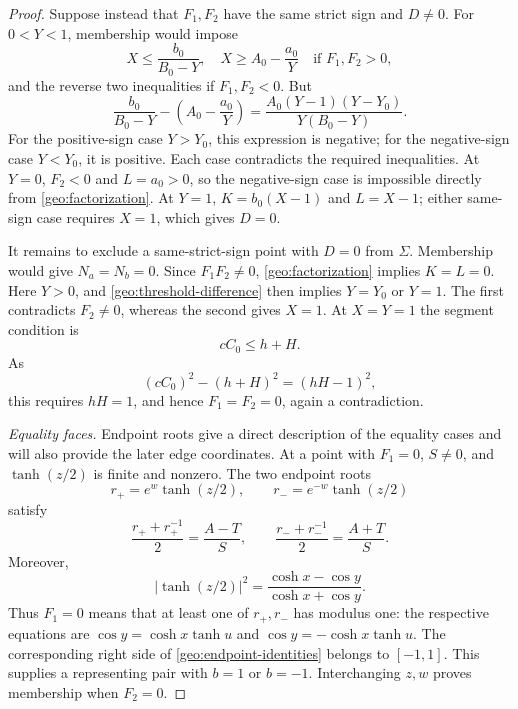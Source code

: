 \documentclass[11pt]{article}
\numberwithin{equation}{section}
\theoremstyle{definition}
\begin{document}
\begin{proof}
Suppose instead that \(F_1,F_2\) have the same strict sign and
\(D\ne0\).  For \(0<Y<1\), membership would impose
\[
 X\leq\frac{b_0}{B_0-Y},\quad
 X\geq A_0-\frac{a_0}{Y}
 \quad\text{if }F_1,F_2>0,
\]
and the reverse two inequalities if \(F_1,F_2<0\).  But
\begin{equation}\label{geo:threshold-difference}
 \frac{b_0}{B_0-Y}-\left(A_0-\frac{a_0}{Y}\right)
 =\frac{A_0(Y-1)(Y-Y_0)}{Y(B_0-Y)}.
\end{equation}
For the positive-sign case \(Y>Y_0\), this expression is negative;
for the negative-sign case \(Y<Y_0\), it is positive.  Each case
contradicts the required inequalities.  At \(Y=0\), \(F_2<0\)
and \(L=a_0>0\), so the negative-sign case is impossible directly
from \eqref{geo:factorization}.  At \(Y=1\),
\(K=b_0(X-1)\) and \(L=X-1\); either same-sign case requires
\(X=1\), which gives \(D=0\).

It remains to exclude a same-strict-sign point with \(D=0\)
from \(\Sigma\).  Membership would give \(N_a=N_b=0\).
Since \(F_1F_2\ne0\), \eqref{geo:factorization} implies
\(K=L=0\).  Here \(Y>0\), and \eqref{geo:threshold-difference}
then implies \(Y=Y_0\) or \(Y=1\).  The first contradicts
\(F_2\ne0\), whereas the second gives \(X=1\).  At \(X=Y=1\)
the segment condition is
\[
                         cC_0\leq h+H.
\]
As
\[
                 (cC_0)^2-(h+H)^2=(hH-1)^2,
\]
this requires \(hH=1\), and hence \(F_1=F_2=0\), again a
contradiction.

\emph{Equality faces.} Endpoint roots give a direct description of
the equality cases and will also provide the later edge coordinates.
At a point with \(F_1=0\), \(S\ne0\), and
\(\tanh(z/2)\) is finite and nonzero.  The two endpoint roots
\begin{equation}\label{geo:endpoint-roots}
 r_+=e^w\tanh(z/2),\qquad r_-=e^{-w}\tanh(z/2)
\end{equation}
satisfy
\begin{equation}\label{geo:endpoint-identities}
 \frac{r_++r_+^{-1}}2=\frac{A-T}{S},\qquad
 \frac{r_-+r_-^{-1}}2=\frac{A+T}{S}.
\end{equation}
Moreover,
\begin{equation}\label{geo:tanh-modulus}
 |\tanh(z/2)|^2=\frac{\cosh x-\cos y}{\cosh x+\cos y}.
\end{equation}
Thus \(F_1=0\) means that at least one of \(r_+,r_-\) has
modulus one: the respective equations are
\(\cos y=\cosh x\tanh u\) and
\(\cos y=-\cosh x\tanh u\).  The corresponding right side
of \eqref{geo:endpoint-identities} belongs to \([-1,1]\).
This supplies a representing pair with \(b=1\) or \(b=-1\).
Interchanging \(z,w\) proves membership when \(F_2=0\).


\end{proof}
\end{document}
